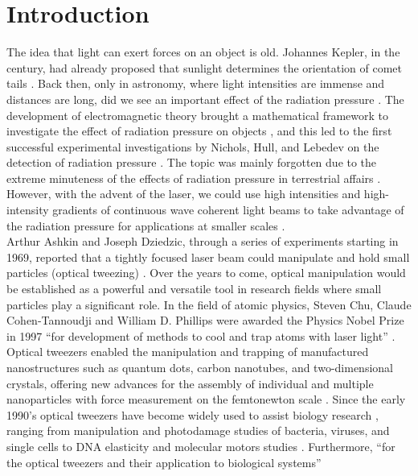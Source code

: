 \documentclass[letterpaper,12pt,oneside]{book}
\begin{document}
\chapter{Introduction} 
The idea that light can exert forces on an object is old. Johannes Kepler, in the  century, had already proposed that sunlight determines the orientation of comet tails \cite{kepler}. Back then, only in astronomy, where light intensities are immense and distances are long, did we see an important effect of the radiation pressure \cite{ashkin1997optical}. The development of electromagnetic theory brought a mathematical framework to investigate the effect of radiation pressure on objects \cite{maxwell1865viii}, and this led to the first successful experimental investigations by Nichols, Hull, and Lebedev on the detection of radiation pressure \cite{nichols1901preliminary,lebedev1883experimental}.  The topic was mainly forgotten due to the extreme minuteness of the effects of radiation pressure in terrestrial affairs \cite{ashkinhistory}.
However, with the advent of the laser, we could use high intensities and high-intensity gradients of continuous wave coherent light beams to take advantage of the radiation pressure for applications at smaller scales \cite{ashkin1997optical,townes2002laser}. \\ 
\indent Arthur Ashkin and Joseph Dziedzic, through a series of experiments starting in 1969, reported that a tightly focused laser beam could manipulate and hold small particles (optical tweezing) \cite{ashkin1970acceleration,ashkin1970atomicdeflection,ashkin1986observation}.
  Over the years to come, optical manipulation would be established as a powerful and versatile tool in research fields where small particles play a significant role. In the field of atomic physics, Steven Chu, Claude Cohen-Tannoudji and William D. Phillips were awarded the Physics Nobel Prize in 1997 “for development of methods to cool and trap atoms with laser light” \cite{NobelPrizeChu}. Optical tweezers enabled the manipulation and trapping of manufactured nanostructures such as quantum dots, carbon nanotubes, and two-dimensional crystals, offering new advances for the assembly of individual and multiple nanoparticles with force measurement on the femtonewton scale \cite{marago2013optical}.
Since the early 1990's optical tweezers have become widely used to assist biology research \cite{jones2015optical}, ranging from manipulation and photodamage studies of bacteria, viruses, and single cells to DNA elasticity and molecular motors studies \cite{ashkinmanipulationvirus,sowa2005directmotor,smith1996overstretchingdna}. Furthermore, “for the optical tweezers and their application to biological systems”
\end{document}
